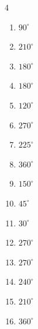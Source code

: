 \begin{multicols}{4}
\begin{enumerate}
  \item $\displaystyle 90^{\circ}$

  \item $\displaystyle 210^{\circ}$

  \item $\displaystyle 180^{\circ}$
        \phantom{$\displaystyle =\pi$}

  \item $\displaystyle 180^{\circ}$
        \phantom{$\displaystyle =\pi$}

  \item $\displaystyle 120^{\circ}$

  \item $\displaystyle 270^{\circ}$

  \item $\displaystyle 225^{\circ}$

  \item $\displaystyle 360^{\circ}$
        \phantom{$\displaystyle =2\pi$}

\columnbreak %

  \item $\displaystyle 150^{\circ}$

  \item $\displaystyle 45^{\circ}$

  \item $\displaystyle 30^{\circ}$

  \item $\displaystyle 270^{\circ}$

  \item $\displaystyle 270^{\circ}$

  \item $\displaystyle 240^{\circ}$

  \item $\displaystyle 210^{\circ}$

  \item $\displaystyle 360^{\circ}$
        \phantom{$\displaystyle =2\pi$}


\end{enumerate}
\end{multicols}
